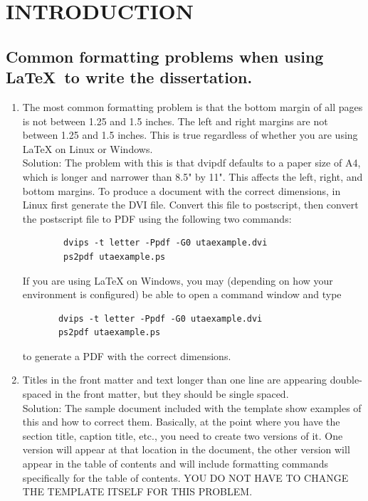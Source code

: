 \chapter{INTRODUCTION}


\label{introduction}

\section{Common formatting problems when using \LaTeX \ to write the dissertation.}
\begin{enumerate}
	\item The most common formatting problem is that the bottom margin of all pages is not between 1.25 and 1.5 inches.  The left and right margins are not between 1.25 and 1.5 inches.  This is true regardless of whether you are using LaTeX on Linux or Windows.
	\\
	Solution:  The problem with this is that dvipdf defaults to a paper size of A4, which is longer and narrower than 8.5" by 11".  This affects the left, right, and bottom margins.  To produce a document with the correct dimensions, in Linux first generate the DVI file.  Convert this file to postscript, then convert the postscript file to PDF using the following two commands:
	\begin{verbatim}
        dvips -t letter -Ppdf -G0 utaexample.dvi
        ps2pdf utaexample.ps
	\end{verbatim}	
    If you are using LaTeX on Windows, you may (depending on how your 
    environment is configured) be able to open a command window and
    type 
	\begin{verbatim}
       dvips -t letter -Ppdf -G0 utaexample.dvi
       ps2pdf utaexample.ps
	\end{verbatim}	
    to generate a PDF with the correct dimensions.
	\item Titles in the front matter and text longer than one line are appearing double-spaced in the front matter, but they should be single spaced.
	\\
	Solution: The sample document included with the template show examples of this and how to correct them.  Basically, at the point where you have the section title, caption title, etc., you need to create two versions of it.  One version will appear at that location in the document, the other version will appear in the table of contents and will include formatting commands specifically for the table of contents.  YOU DO NOT HAVE TO CHANGE THE TEMPLATE ITSELF FOR THIS PROBLEM.
\end{enumerate}


